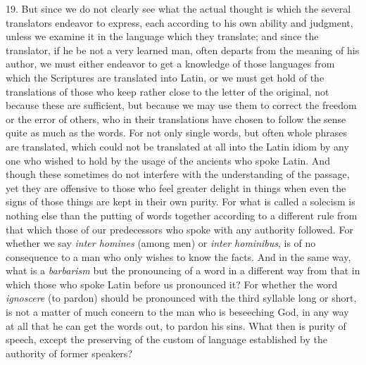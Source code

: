 19. But since we do not clearly see what the actual thought is which the several translators endeavor to express, each according to his own ability and judgment, unless we examine it in the language which they translate; and since the translator, if he be not a very learned man, often departs from the meaning of his author, we must either endeavor to get a knowledge of those languages from which the Scriptures are translated into Latin, or we must get hold of the translations of those who keep rather close to the letter of the original, not because these are sufficient, but because we may use them to correct the freedom or the error of others, who in their translations have chosen to follow the sense quite as much as the words. For not only single words, but often whole phrases are translated, which could not be translated at all into the Latin idiom by any one who wished to hold by the usage of the ancients who spoke Latin. And though these sometimes do not interfere with the understanding of the passage, yet they are offensive to those who feel greater delight in things when even the signs of those things are kept in their own purity. For what is called a solecism is nothing else than the putting of words together according to a different rule from that which those of our predecessors who spoke with any authority followed. For whether we say \emph{inter homines} (among men) or \emph{inter hominibus}, is of no consequence to a man who only wishes to know the facts. And in the same way, what is a \emph{barbarism} but the pronouncing of a word in a different way from that in which those who spoke Latin before us pronounced it? For whether the word \emph{ ignoscere} (to pardon) should be pronounced with the third syllable long or short, is not a matter of much concern to the man who is beseeching God, in any way at all that he can get the words out, to pardon his sins. What then is purity of speech, except the preserving of the custom of language established by the authority of former speakers?

